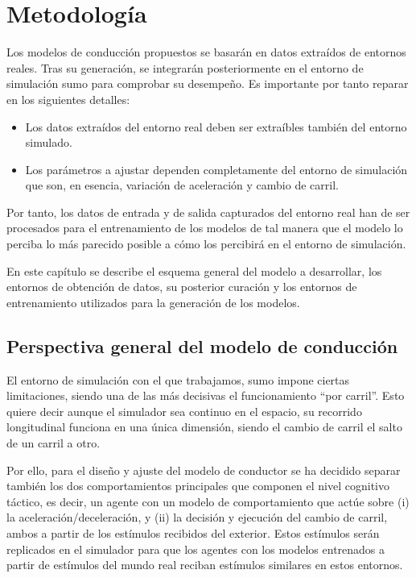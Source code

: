 \chapter{Metodología}
\label{ch:methodology}

Los modelos de conducción propuestos se basarán en datos extraídos de entornos reales. Tras su generación, se integrarán posteriormente en el entorno de simulación \ac{sumo} para comprobar su desempeño. Es importante por tanto reparar en los siguientes detalles:

\begin{itemize}
	\item Los datos extraídos del entorno real deben ser extraíbles también del entorno simulado. 
	\item Los parámetros a ajustar dependen completamente del entorno de simulación que son, en esencia, variación de aceleración y cambio de carril.
\end{itemize}

Por tanto, los datos de entrada y de salida capturados del entorno real han de ser procesados para el entrenamiento de los modelos de tal manera que el modelo lo perciba lo más parecido posible a cómo los percibirá en el entorno de simulación.

En este capítulo se describe el esquema general del modelo a desarrollar, los entornos de obtención de datos, su posterior curación y los entornos de entrenamiento utilizados para la generación de los modelos.

\section{Perspectiva general del modelo de conducción}

El entorno de simulación con el que trabajamos, \ac{sumo} impone ciertas limitaciones, siendo una de las más decisivas el funcionamiento \enquote{por carril}. Esto quiere decir aunque el simulador sea continuo en el espacio, su recorrido longitudinal funciona en una única dimensión, siendo el cambio de carril el salto de un carril a otro.

Por ello, para el diseño y ajuste del modelo de conductor se ha decidido separar también los dos comportamientos principales que componen el nivel cognitivo táctico, es decir, un agente con un modelo de comportamiento que actúe sobre (i) la aceleración/deceleración, y (ii) la decisión y ejecución del cambio de carril, ambos a partir de los estímulos recibidos del exterior. Estos estímulos serán replicados en el simulador para que los agentes con los modelos entrenados a partir de estímulos del mundo real reciban estímulos similares en estos entornos.

